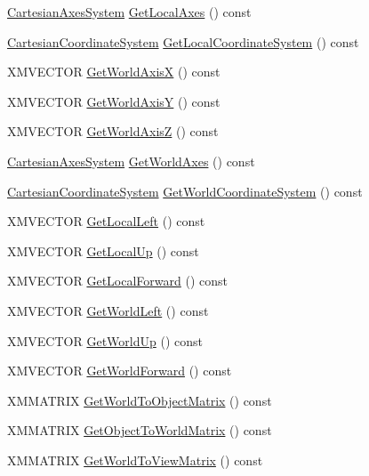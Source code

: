 \begin{DoxyCompactItemize}
\item 
\hyperlink{structmage_1_1_cartesian_axes_system}{Cartesian\+Axes\+System} \hyperlink{structmage_1_1_transform_a84d2c6774dc1be15c2926bcc56856c7a}{Get\+Local\+Axes} () const
\item 
\hyperlink{structmage_1_1_cartesian_coordinate_system}{Cartesian\+Coordinate\+System} \hyperlink{structmage_1_1_transform_aa88457f582eca76b7305349e197bce7f}{Get\+Local\+Coordinate\+System} () const
\item 
X\+M\+V\+E\+C\+T\+OR \hyperlink{structmage_1_1_transform_ac7a718127c5212bb73d04302371473d0}{Get\+World\+AxisX} () const
\item 
X\+M\+V\+E\+C\+T\+OR \hyperlink{structmage_1_1_transform_a9c4452fa4aefb48e4e6c9a4a38fac32c}{Get\+World\+AxisY} () const
\item 
X\+M\+V\+E\+C\+T\+OR \hyperlink{structmage_1_1_transform_a580b65d46b4af8086fab60d0737fd353}{Get\+World\+AxisZ} () const
\item 
\hyperlink{structmage_1_1_cartesian_axes_system}{Cartesian\+Axes\+System} \hyperlink{structmage_1_1_transform_a580a4f9fd987259da0cf0355ade7fb4b}{Get\+World\+Axes} () const
\item 
\hyperlink{structmage_1_1_cartesian_coordinate_system}{Cartesian\+Coordinate\+System} \hyperlink{structmage_1_1_transform_a809600adbb284334d444ae8c50b17a1d}{Get\+World\+Coordinate\+System} () const
\item 
X\+M\+V\+E\+C\+T\+OR \hyperlink{structmage_1_1_transform_a5f8a16cfb69024d9d361a9255c57e44c}{Get\+Local\+Left} () const
\item 
X\+M\+V\+E\+C\+T\+OR \hyperlink{structmage_1_1_transform_a1f799786b8b8500504ca7cf2ecbea21a}{Get\+Local\+Up} () const
\item 
X\+M\+V\+E\+C\+T\+OR \hyperlink{structmage_1_1_transform_ab029a8208164b53c75352c53736a5c38}{Get\+Local\+Forward} () const
\item 
X\+M\+V\+E\+C\+T\+OR \hyperlink{structmage_1_1_transform_aef18a0e685f56ce4a805b2fef57287f6}{Get\+World\+Left} () const
\item 
X\+M\+V\+E\+C\+T\+OR \hyperlink{structmage_1_1_transform_af28786b745a144eef74d69a55055b00a}{Get\+World\+Up} () const
\item 
X\+M\+V\+E\+C\+T\+OR \hyperlink{structmage_1_1_transform_a24bd3a710a3c0bde7a6d2f2de56a315c}{Get\+World\+Forward} () const
\item 
X\+M\+M\+A\+T\+R\+IX \hyperlink{structmage_1_1_transform_a773c1db9e475deb6d9f446a88cfae30f}{Get\+World\+To\+Object\+Matrix} () const
\item 
X\+M\+M\+A\+T\+R\+IX \hyperlink{structmage_1_1_transform_a6fe97738bf9ae9d1e677c3e09b8c6d81}{Get\+Object\+To\+World\+Matrix} () const
\item 
X\+M\+M\+A\+T\+R\+IX \hyperlink{structmage_1_1_transform_a33cc590d779f69044d183bab653bd260}{Get\+World\+To\+View\+Matrix} () const
\end{DoxyCompactItemize}
